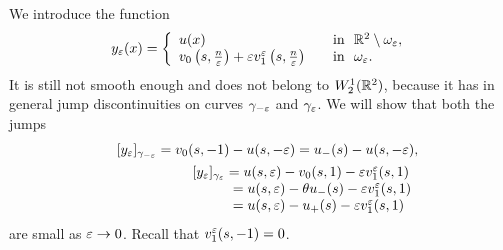 %


We introduce the function
\begin{equation}\label{ApproxWe}
y_\varepsilon(x)=
\left\{
  \begin{array}{ll}
    u(x)&\quad \hbox{in \ }\mathbb R^2\setminus \omega_\varepsilon, \\
    v_0\left(s,\textstyle\frac n{\varepsilon}\right)+\varepsilon v_1^\varepsilon\left(s,\textstyle\frac n{\varepsilon}\right)
&\quad \hbox{in \ } \omega_\varepsilon.
  \end{array}
\right.
\end{equation}
It is still not smooth enough and does not belong to $W_2^1(\mathbb R^2)$, because it has  in general  jump discontinuities on curves  $\gamma_{-\varepsilon}$ and $\gamma_\varepsilon$.
We will show  that both the jumps
\begin{eqnarray}\nonumber
&&[y_\varepsilon]_{\gamma_{-\varepsilon}}=v_0(s,-1)-u(s,-\varepsilon)=u_-(s)-u(s,-\varepsilon),\\\nonumber
&&
\begin{array}{l}
[y_\varepsilon]_{\gamma_{\varepsilon}}=u(s,\varepsilon)-v_0(s,1)-\varepsilon v_1^\varepsilon(s,1)\\
\kern29pt=u(s,\varepsilon)-\theta u_-(s)-\varepsilon v_1^\varepsilon(s,1)\\\nonumber
\kern29pt=
u(s,\varepsilon)- u_+(s)-\varepsilon v_1^\varepsilon(s,1)
\end{array}
\end{eqnarray}
are small as $\varepsilon\to 0$.
Recall that $v_1^\varepsilon(s,-1)=0$.

